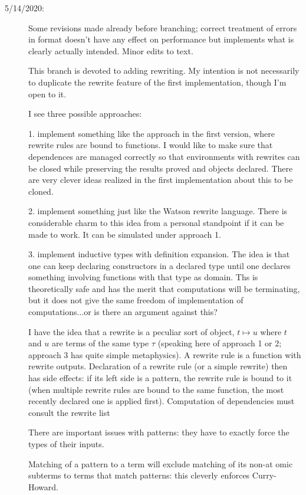 \documentclass[12pt]{article}
\begin{document}
\begin{description}
\item[5/14/2020:]  Some revisions made already before branching;  correct treatment of errors in format doesn't have any effect on performance
but implements what is clearly actually intended.  Minor edits to text.

This branch is devoted to adding rewriting.  My intention is not necessarily to duplicate the rewrite feature of the first implementation, though I'm open to it.

I see three possible approaches:

1.  implement something like the approach in the first version, where rewrite rules are bound to functions.  I would like to make sure that dependences
are managed correctly so that environments with rewrites can be closed while preserving the results proved and objects declared.  There are very clever
ideas realized in the first implementation about this to be cloned.

2.  implement something just like the Watson rewrite language.  There is considerable charm to this idea from a personal standpoint if it can be made to work.  It can
be simulated under approach 1.

3.  implement inductive types with definition expansion.  The idea is that one can keep declaring constructors in a declared type until one declares something involving
functions with that type as domain.  Ths is theoretically safe and has the merit that computations will be terminating, but it does not give the same freedom of implementation
of computations...or is there an argument against this?

I have the idea that a rewrite is a peculiar sort of object, $t \mapsto u$ where $t$ and $u$ are terms of the same type $\tau$ (speaking here of approach 1 or 2;
approach 3  has quite simple metaphysics).  A rewrite rule is a function with rewrite outputs.  Declaration of a rewrite rule (or a simple rewrite) then has side effects:
if its left side is a pattern, the rewrite rule is bound to it (when multiple rewrite rules are bound to the same function, the most recently declared one is applied first).
Computation of dependencies must consult the rewrite list

There are important issues with patterns:  they have to exactly force the types of their inputs.

Matching of a pattern to a term will exclude matching of its non-at
omic subterms to terms that match patterns:  this cleverly enforces Curry-Howard.


\end{description}
\end{document}

